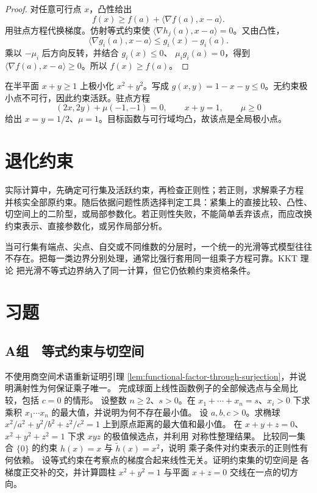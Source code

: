 \begin{proof}
对任意可行点 $x$，凸性给出
\[
 f(x)\ge f(a)+\langle\nabla f(a),x-a\rangle.
\]
用驻点方程代换梯度。仿射等式约束使
$\langle\nabla h_j(a),x-a\rangle=0$。又由凸性，
\[
 \langle\nabla g_i(a),x-a\rangle
 \le g_i(x)-g_i(a).
\]
乘以 $-\mu_i$ 后方向反转，并结合 $g_i(x)\le0$、
$\mu_i g_i(a)=0$，得到
$\langle\nabla f(a),x-a\rangle\ge0$。所以 $f(x)\ge f(a)$。
\end{proof}

\begin{example}
在半平面 $x+y\ge1$ 上极小化 $x^2+y^2$。写成
$g(x,y)=1-x-y\le0$。无约束极小点不可行，因此约束活跃。驻点方程
\[
 (2x,2y)+\mu(-1,-1)=0,\qquad x+y=1,\qquad \mu\ge0
\]
给出 $x=y=1/2$、$\mu=1$。目标函数与可行域均凸，故该点是全局极小点。
\end{example}

\section{退化约束}

实际计算中，先确定可行集及活跃约束，再检查正则性；若正则，求解乘子方程
并核实全部原约束。随后依据问题性质选择判定工具：紧集上的直接比较、凸性、
切空间上的二阶型，或局部参数化。若正则性失败，不能简单丢弃该点，而应改换
约束表示、直接参数化，或另作局部分析。

当可行集有端点、尖点、自交或不同维数的分层时，一个统一的光滑等式模型往往
不存在。把每一类边界分别处理，通常比强行套用同一组乘子方程可靠。KKT 理论
把光滑不等式边界纳入了同一计算，但它仍依赖约束资格条件。

\section*{习题}

\subsection*{A组　等式约束与切空间}
\begin{enumerate}[label=\textbf{\thechapter.\arabic*.}]
 不使用商空间术语重新证明引理
 \ref{lem:functional-factor-through-surjection}，并说明满射性为何保证乘子唯一。
 完成球面上线性函数例子的全部候选点与全局比较，包括 $c=0$ 的情形。
 设整数 \(n\ge2\)、\(s>0\)。在 $x_1+\cdots+x_n=s$、$x_i>0$ 下求乘积
 $x_1\cdots x_n$ 的最大值，并说明为何不存在最小值。
 设 \(a,b,c>0\)。求椭球 $x^2/a^2+y^2/b^2+z^2/c^2=1$
 上到原点距离的最大值和最小值。
 在 $x+y+z=0$、$x^2+y^2+z^2=1$ 下求 $xyz$ 的极值候选点，并利用
 对称性整理结果。
 比较同一集合 $\{0\}$ 的约束 $h(x)=x$ 与 $\widetilde h(x)=x^2$，说明
 乘子条件对约束表示的正则性有何依赖。
 设等式约束在考察点的梯度合起来线性无关。证明约束集的切空间是
 各梯度正交补的交，并计算圆柱
 $x^2+y^2=1$ 与平面 $x+z=0$ 交线在一点的切方向。
\end{enumerate}

